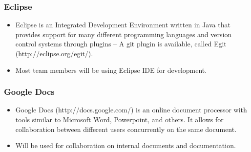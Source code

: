 \documentclass[letterpaper,12pt]{article}
\begin{document}
\subsubsection{Eclipse}
	\begin{itemize}
		\item Eclipse is an Integrated Development Environment written in Java that provides support for many different programming languages and version control systems through plugins -- A git plugin is available, called Egit (http://eclipse.org/egit/).
		\item Most team members will be using Eclipse IDE for development.
	\end{itemize}
\subsubsection{Google Docs}
	\begin{itemize}
		\item Google Docs (http://docs.google.com/) is an online document processor with tools similar to Microsoft Word, Powerpoint, and others. It allows for collaboration between different users concurrently on the same document.
		\item Will be used for collaboration on internal documents and documentation.
	\end{itemize}
\end{document}
